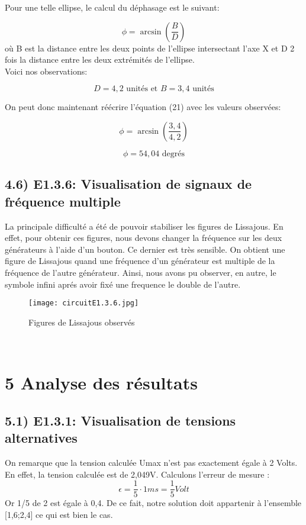 \documentclass{report}
\begin{document}
Pour une telle ellipse, le calcul du d\'ephasage est le suivant:

\begin{equation}
     \phi = \arcsin(\frac{B}{D})
\end{equation}
o\`u B est la distance entre les deux points de l'ellipse intersectant l'axe X et D 2 fois la distance entre les deux extr\'emit\'es de l'ellipse.
\\
Voici nos observations:

\begin{equation}
    D = 4,2 \text{ unit\'es et } B = 3,4 \text{ unit\'es}     
\end{equation}

On peut donc maintenant r\'e\'ecrire l'\'equation (21) avec les valeurs observ\'ees:

\begin{equation}
    \phi = \arcsin(\frac{3,4}{4,2})    
\end{equation}

\begin{equation}
    \phi = 54,04 \text{ degr\'es}   
\end{equation}

\subsection*{4.6) E1.3.6: Visualisation de signaux de fr\'equence multiple}
\hspace*{0.5cm}
La principale difficult\'e a \'et\'e de pouvoir stabiliser les figures de Lissajous. En effet, pour obtenir ces figures, nous devons changer la fr\'equence sur les deux g\'en\'erateurs \`a l'aide d'un bouton. Ce dernier est tr\`es sensible. On obtient une figure de Lissajous quand une fr\'equence d'un g\'en\'erateur est multiple de la fr\'equence de l'autre g\'en\'erateur. Ainsi, nous avons pu observer, en autre, le symbole infini apr\'es avoir fix\'e une frequence le double de l'autre.
\hspace*{0.5cm}
\begin{figure}[ht!]
\centering
\texttt{[image: circuitE1.3.6.jpg]}
\caption{Figures de Lissajous observ\'es}
\label{overflow}
\end{figure}
\\

\section*{5 Analyse des r\'esultats}
\subsection*{5.1) E1.3.1: Visualisation de tensions alternatives}
\hspace*{0.5cm}
On remarque que la tension calcul\'ee Umax n'est pas exactement \'egale \`a 2 Volts. En effet, la tension calcul\'ee est de 2,049V.
Calculons l'erreur de mesure :
\begin{equation}
    \epsilon = \frac{1}{5} \cdot 1ms = \frac{1}{5}Volt
\end{equation}
Or 1/5 de 2 est \'egale \`a 0,4. De ce fait, notre solution doit appartenir à l'ensemble [1,6;2,4] ce qui est bien le cas.
\end{document}

